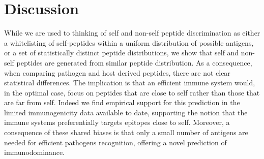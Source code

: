 \documentclass[superscriptaddress,twocolumn,pre]{revtex4}
\newcommand{\<}{\langle}
\renewcommand{\>}{\rangle}
\begin{document}
%
%

\section{Discussion}

While we are used to thinking of self and non-self peptide discrimination as either a whitelisting of self-peptides within a uniform distribution of possible antigens, or a set of statistically distinct peptide distributions, we show that self and non-self peptides are generated from similar peptide distribution. As a consequence, when comparing pathogen and host derived peptides, there are not clear statistical differences. The implication is that an efficient immune system would, in the optimal case, focus on peptides that are close to self rather than those that are far from self. Indeed we find empirical support for this prediction in the limited immunogenicity data available to date, supporting the notion that the immune systems preferentially targets epitopes close to self. Moreover, a consequence of these shared biases is that only a small number of antigens are needed for efficient pathogens recognition, offering a novel prediction of immunodominance.
\end{document}
